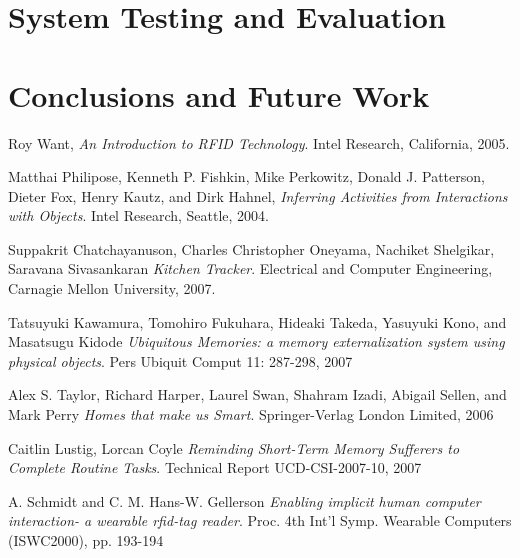 \documentclass[]{final_report}
\begin{document}
\chapter{System Testing and Evaluation}
\newpage
\chapter{Conclusions and Future Work}
\newpage

\newpage
\begin{thebibliography}{99}
	  Roy Want,
	  \emph{An Introduction to RFID Technology}.
	  Intel Research, California, 2005.
	  
	  Matthai Philipose, Kenneth P. Fishkin, Mike Perkowitz, Donald J. Patterson, Dieter Fox, Henry Kautz, and Dirk Hahnel,
	  \emph{Inferring Activities from Interactions with Objects}.
	  Intel Research, Seattle, 2004.
	  
	  Suppakrit Chatchayanuson, Charles Christopher Oneyama, Nachiket Shelgikar, Saravana Sivasankaran 
	  \emph{Kitchen Tracker}.
	  Electrical and Computer Engineering, Carnagie Mellon University, 2007.
	  
	  Tatsuyuki Kawamura, Tomohiro Fukuhara, Hideaki Takeda, Yasuyuki Kono, and Masatsugu Kidode 
	  \emph{Ubiquitous Memories: a memory externalization system using physical objects}.
	  Pers Ubiquit Comput 11: 287-298, 2007
	  
	  Alex S. Taylor, Richard Harper, Laurel Swan, Shahram Izadi, Abigail Sellen, and Mark Perry
	  \emph{Homes that make us Smart}.
	  Springer-Verlag London Limited, 2006
	  
	  Caitlin Lustig, Lorcan Coyle
	  \emph{Reminding Short-Term Memory Sufferers to Complete Routine Tasks}.
	  Technical Report UCD-CSI-2007-10, 2007
	  
	  A. Schmidt and C. M. Hans-W. Gellerson
	  \emph{Enabling implicit human computer interaction- a wearable rfid-tag reader}.
	  Proc. 4th Int'l Symp. Wearable Computers (ISWC2000), pp. 193-194
\end{thebibliography}
\label{endpage}
\end{document}
